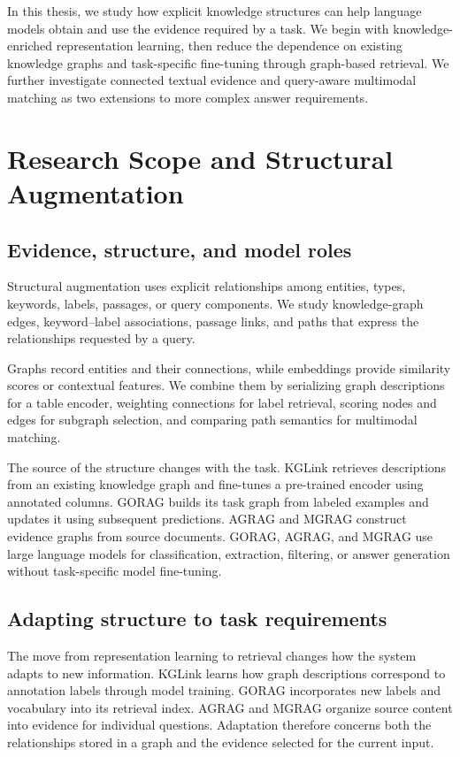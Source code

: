 In this thesis, we study how explicit knowledge structures can help language models obtain and use the evidence required by a task. We begin with knowledge-enriched representation learning, then reduce the dependence on existing knowledge graphs and task-specific fine-tuning through graph-based retrieval. We further investigate connected textual evidence and query-aware multimodal matching as two extensions to more complex answer requirements.

\section{Research Scope and Structural Augmentation}
\label{sec:introduction:scope}
\subsection{Evidence, structure, and model roles}
Structural augmentation uses explicit relationships among entities, types, keywords, labels, passages, or query components. We study knowledge-graph edges, keyword--label associations, passage links, and paths that express the relationships requested by a query.

Graphs record entities and their connections, while embeddings provide similarity scores or contextual features. We combine them by serializing graph descriptions for a table encoder, weighting connections for label retrieval, scoring nodes and edges for subgraph selection, and comparing path semantics for multimodal matching.

The source of the structure changes with the task. KGLink retrieves descriptions from an existing knowledge graph and fine-tunes a pre-trained encoder using annotated columns. GORAG builds its task graph from labeled examples and updates it using subsequent predictions. AGRAG and MGRAG construct evidence graphs from source documents. GORAG, AGRAG, and MGRAG use large language models for classification, extraction, filtering, or answer generation without task-specific model fine-tuning.

\subsection{Adapting structure to task requirements}

The move from representation learning to retrieval changes how the system adapts to new information. KGLink learns how graph descriptions correspond to annotation labels through model training. GORAG incorporates new labels and vocabulary into its retrieval index. AGRAG and MGRAG organize source content into evidence for individual questions. Adaptation therefore concerns both the relationships stored in a graph and the evidence selected for the current input.

